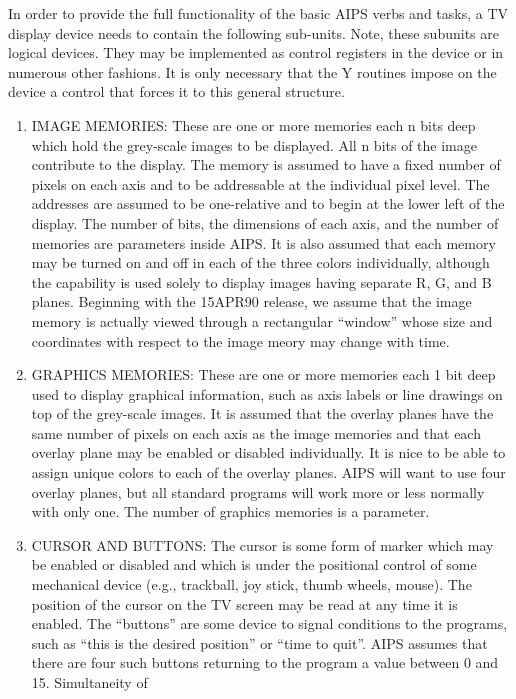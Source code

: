 In order to provide the full functionality of the basic AIPS verbs and
tasks, a TV display device needs to contain the following sub-units.
Note, these subunits are logical devices.  They may be implemented as
control registers in the device or in numerous other fashions.  It is
only necessary that the Y routines impose on the device a control that
forces it to this general structure.
\begin{enumerate} %
\item IMAGE MEMORIES:  These are one or more memories each n bits deep
which hold the grey-scale images to be displayed.  All n bits of the
image contribute to the display.  The memory is assumed to have a
fixed number of pixels on each axis and to be addressable at the
individual pixel level.  The addresses are assumed to be one-relative
and to begin at the lower left of the display.  The number of bits,
the dimensions of each axis, and the number of memories are parameters
inside AIPS.  It is also assumed that each memory may be turned on and
off in each of the three colors individually, although the capability
is used solely to display images having separate R, G, and B planes.
Beginning with the 15APR90 release, we assume that the image memory is
actually viewed through a rectangular ``window'' whose size and
coordinates with respect to the image meory may change with time.
\item GRAPHICS MEMORIES:  These are one or more memories each 1 bit deep
used to display graphical information, such as axis labels or line
drawings on top of the grey-scale images.  It is assumed that the
overlay planes have the same number of pixels on each axis as the
image memories and that each overlay plane may be enabled or disabled
individually.  It is nice to be able to assign unique colors to each
of the overlay planes.  AIPS will want to use four overlay planes, but
all standard programs will work more or less normally with only one.
The number of graphics memories is a parameter.
\item CURSOR AND BUTTONS:  The cursor is some form of marker which may
be enabled or disabled and which is under the positional control of
some mechanical device (e.g., trackball, joy stick, thumb wheels,
mouse). The position of the cursor on the TV screen may be read at any
time it is enabled.  The ``buttons'' are some device to signal
conditions to the programs, such as ``this is the desired position'' or
``time to quit''. AIPS assumes that there are four such buttons
returning to the program a value between 0 and 15.  Simultaneity of

\end{enumerate}
